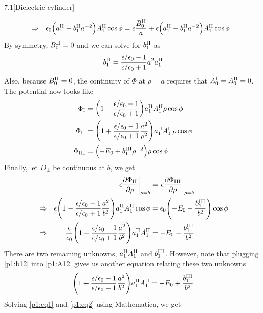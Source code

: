 \documentclass[12pt]{article}
\begin{document}
\begin{problem}{7.1}[Dielectric cylinder]
\begin{solution}
\begin{align}
    &\Rightarrow&
    \epsilon_0\qty(a_1^{\RN{2}}+b_1^{\RN{2}}a^{-2})A_1^{\RN{2}}\cos\phi
    &=\epsilon\frac{B_0^{\RN{2}}}{a}+\epsilon\qty(a_1^{\RN{2}}-b_1^{\RN{2}}a^{-2})A_1^{\RN{2}}\cos\phi
\end{align}
By symmetry, $B_0^{\RN{2}}=0$ and we can solve for $b_1^{\RN{2}}$ as
\begin{equation}\label{p1:b12}
    b_1^{\RN{2}}=\frac{\epsilon/\epsilon_0-1}{\epsilon/\epsilon_0+1}a^2a_1^{\RN{2}} 
\end{equation}
Also, because $B_0^{\RN{2}}=0$, the continuity of $\Phi$ at $\rho=a$ requires
that $A_0^{\RN{1}}=A_0^{\RN{2}}=0$. The potential now looks like
\begin{subequations}
    \begin{align}
        \Phi_{\RN{1}}
        &=\qty(1+\frac{\epsilon/\epsilon_0-1}{\epsilon/\epsilon_0+1})a_1^{\RN{2}}A_1^{\RN{2}}\rho\cos\phi\\
        \Phi_{\RN{2}}
        &=\qty(1+\frac{\epsilon/\epsilon_0-1}{\epsilon/\epsilon_0+1}\frac{a^2}{\rho^2})a_1^{\RN{2}}A_1^{\RN{2}}\rho\cos\phi\\
        \Phi_{\RN{3}}
        &=\qty(-E_0+b_1^{\RN{3}}\rho^{-2})\rho\cos\phi
    \end{align} 
\end{subequations}
Finally, let $D_\bot$ be continuous at $b$, we get
\begin{align}\label{p1:eq1}
    &&\eval{\epsilon\frac{\partial\Phi_{\RN{2}}}{\partial\rho}}_{\rho=b} 
    &=\eval{\epsilon\frac{\partial\Phi_{\RN{3}}}{\partial\rho}}_{\rho=b}\notag\\
    &\Rightarrow&
    \epsilon\qty(1-\frac{\epsilon/\epsilon_0-1}{\epsilon/\epsilon_0+1}\frac{a^2}{b^2})a_1^{\RN{2}}A_1^{\RN{2}}\cos\phi
    &=\epsilon_0\qty(-E_0-\frac{b_1^{\RN{3}}}{b^2})\cos\phi\notag\\
    &\Rightarrow&
    \frac{\epsilon}{\epsilon_0}\qty(1-\frac{\epsilon/\epsilon_0-1}{\epsilon/\epsilon_0+1}\frac{a^2}{b^2})a_1^{\RN{2}}A_1^{\RN{2}}
    &=-E_0-\frac{b_1^{\RN{3}}}{b^2}
\end{align}
There are two remaining unknowns, $a_1^{\RN{2}}A_1^{\RN{2}}$ and $b_1^{\RN{3}}$.
However, note that plugging \eqref{p1:b12} into \eqref{p1:A12} gives us another
equation relating these two unknowns
\begin{equation}\label{p1:eq2}
    \qty(1+\frac{\epsilon/\epsilon_0-1}{\epsilon/\epsilon_0+1}\frac{a^2}{b^2})
    a_1^{\RN{2}}A_1^{\RN{2}}=-E_0+\frac{b_1^{\RN{3}}}{b^2}
\end{equation}
Solving \eqref{p1:eq1} and \eqref{p1:eq2} using Mathematica, we get

\end{solution}
\end{problem}
\end{document}
